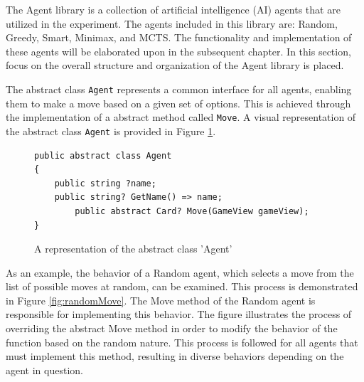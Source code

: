 The Agent library is a collection of artificial intelligence (AI) agents that are utilized in the experiment. The agents included in this library are: Random, Greedy, Smart, Minimax, and MCTS. The functionality and implementation of these agents will be elaborated upon in the subsequent chapter. In this section, focus on the overall structure and organization of the Agent library is placed.

The abstract class \texttt{Agent} represents a common interface for all agents, enabling them to make a move based on a given set of options. This is achieved through the implementation of a abstract method called \texttt{Move}. A visual representation of the abstract class \texttt{Agent} is provided in Figure \ref{fig:abstractClass}.

\begin{figure}[h]
\captionsetup{justification=centering}
\begin{lstlisting}[frame=single]
public abstract class Agent
{
	public string ?name;
	public string? GetName() => name;
    	public abstract Card? Move(GameView gameView);
}
\end{lstlisting}
\caption{A representation of the abstract class 'Agent'}
\label{fig:abstractClass}
\end{figure}

As an example, the behavior of a Random agent, which selects a move from the list of possible moves at random, can be examined. This process is demonstrated in Figure \ref{fig:randomMove}. The Move method of the Random agent is responsible for implementing this behavior. The figure illustrates the process of overriding the abstract Move method in order to modify the behavior of the function based on the random nature. This process is followed for all agents that must implement this method, resulting in diverse behaviors depending on the agent in question.